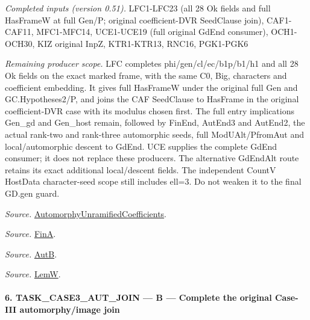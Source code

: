 \documentclass[11pt,a4paper]{article}
\numberwithin{equation}{section}
\theoremstyle{remark}\newtheorem{remark}[theorem]{Remark}
\begin{document}
\emph{Completed inputs (version 0.51).} LFC1-LFC23 (all 28 Ok fields and full HasFrameW at full Gen/P; original coefficient-DVR SeedClause join), CAF1-CAF11, MFC1-MFC14, UCE1-UCE19 (full original GdEnd consumer), OCH1-OCH30, KIZ original InpZ, KTR1-KTR13, RNC16, PGK1-PGK6

\emph{Remaining producer scope.} LFC completes phi/gen/cl/ec/b1p/b1/h1 and all 28 Ok fields on the exact marked frame, with the same C0, Big, characters and coefficient embedding. It gives full HasFrameW under the original full Gen and GC.Hypotheses2/P, and joins the CAF SeedClause to HasFrame in the original coefficient-DVR case with its modulus chosen first. The full entry implications Gen\_\allowbreak gd and Gen\_\allowbreak host remain, followed by FinEnd, AutEnd3 and AutEnd2, the actual rank-two and rank-three automorphic seeds, full ModUAlt/PfromAut and local/automorphic descent to GdEnd. UCE supplies the complete GdEnd consumer; it does not replace these producers. The alternative GdEndAlt route retains its exact additional local/descent fields. The independent CountV HostData character-seed scope still includes ell=3. Do not weaken it to the final GD.gen guard.

\emph{Source.} \href{https://github.com/CocoSgt/riemann-hypothesis-lean/blob/7cbf7a0c32fca1badf05931879a37c3f8a2b03b4/src/Development/AutomorphicArithmetic/AutomorphicVarieties/AutomorphicCases/AutomorphyUnramifiedCoefficients.lean#L24-L27}{AutomorphyUnramifiedCoefficients}.

\emph{Source.} \href{https://github.com/CocoSgt/riemann-hypothesis-lean/blob/7cbf7a0c32fca1badf05931879a37c3f8a2b03b4/src/Development/AutomorphicArithmetic/AutomorphicVarieties/AutomorphicCases/AutomorphyUnramifiedCoefficients.lean#L12-L13}{FinA}.

\emph{Source.} \href{https://github.com/CocoSgt/riemann-hypothesis-lean/blob/7cbf7a0c32fca1badf05931879a37c3f8a2b03b4/src/Development/AutomorphicArithmetic/AutomorphicVarieties/AutomorphicCases/AutomorphyUnramifiedCoefficients.lean#L15-L17}{AutB}.

\emph{Source.} \href{https://github.com/CocoSgt/riemann-hypothesis-lean/blob/7cbf7a0c32fca1badf05931879a37c3f8a2b03b4/src/Development/AutomorphicArithmetic/AutomorphicVarieties/AutomorphicCases/AutomorphyUnramifiedCoefficients.lean#L19-L22}{LemW}.



\paragraph{6. TASK\_\allowbreak CASE3\_\allowbreak AUT\_\allowbreak JOIN — B — Complete the original Case-III automorphy/image join}
\end{document}
